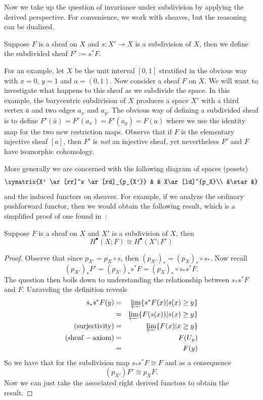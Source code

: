 Now we take up the question of invariance under subdivision by applying the derived perspective. For convenience, we work with sheaves, but the reasoning can be dualized.

\begin{defn}
 Suppose $F$ is a sheaf on $X$ and $s:X'\to X$ is a subdivision of $X$, then we define the subdivided sheaf $F':=s^*F$.
\end{defn}

For an example, let $X$ be the unit interval $[0,1]$ stratified in the obvious way with $x=0$, $y=1$ and $a=(0,1)$. Now consider a sheaf $F$ on $X$. We will want to investigate what happens to this sheaf as we subdivide the space. In this example, the barycentric subdivision of $X$ produces a space $X'$ with a third vertex $\bar{a}$ and two edges $a_x$ and $a_y$. The obvious way of defining a subdivided sheaf is to define $F'(\bar{a})=F'(a_x)=F'(a_y)=F(a)$ where we use the identity map for the two new restriction maps. Observe that if $F$ is the elementary injective sheaf $[a]$, then $F'$ is \emph{not} an injective sheaf, yet nevertheless $F'$ and $F$ have isomorphic cohomology.

More generally we are concerned with the following diagram of spaces (posets)
\[
 \xymatrix{X' \ar[rr]^s \ar[rd]_{p_{X'}} & & X\ar[ld]^{p_X}\\
	      &\star&}
\]
and the induced functors on sheaves. For example, if we analyze the ordinary pushforward functor, then we would obtain the following result, which is a simplified proof of one found in~\cite[Thm. 1.5.2]{shepard}:

\begin{thm}\label{thm:subdivision}
 Suppose $F$ is a sheaf on $X$ and $X'$ is a subdivision of $X$, then
\[
 H^{\bullet}(X;F)\cong H^{\bullet}(X';F')
\]
\end{thm}
\begin{proof}
Observe that since $p_{X'}=p_X\circ s$, then $(p_{X'})_*=(p_X)_*\circ s_*$. Now recall $$(p_{X'})_*F'=(p_{X'})_*s^*F=(p_{X})_*\circ s_* s^* F.$$ 
The question then boils down to understanding the relationship between $s_*s^*F$ and $F$. Unraveling the definition reveals
\begin{eqnarray*}
 s_*s^*F(y) & = &\varprojlim \{s^*F(x) | s(x)\geq y\} \\
&=&\varprojlim \{F(s(x)) | s(x)\geq y\} \\
(\mathrm{surjectivity})&=&\varprojlim \{F(x) | x\geq y\} \\
(\mathrm{sheaf-axiom})&=& F(U_y) \\
&=& F(y)
\end{eqnarray*}
So we have that for the subdivision map $s_*s^*F\cong F$ and as a consequence
$$(p_{X'})F'\cong p_X F.$$
Now we can just take the associated right derived functors to obtain the result.
\end{proof}

